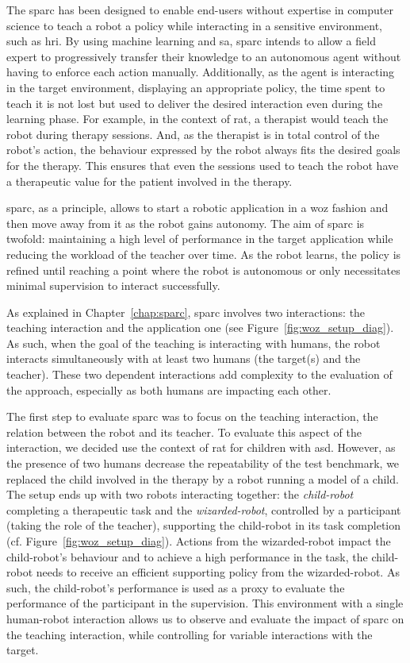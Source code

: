 The \gls{sparc} has been designed to enable end-users without expertise in computer science to teach a robot a policy while interacting in a sensitive environment, such as \gls{hri}. By using machine learning and \gls{sa}, \gls{sparc} intends to allow a field expert to progressively transfer their knowledge to an autonomous agent without having to enforce each action manually. Additionally, as the agent is interacting in the target environment, displaying an appropriate policy, the time spent to teach it is not lost but used to deliver the desired interaction even during the learning phase. For example, in the context of \gls{rat}, a therapist would teach the robot during therapy sessions. And, as the therapist is in total control of the robot's action, the behaviour expressed by the robot always fits the  desired goals for the therapy. This ensures that even the sessions used to teach the robot have a therapeutic value for the patient involved in the therapy.

\gls{sparc}, as a principle, allows to start a robotic application in a \gls{woz} fashion and then move away from it as the robot gains autonomy. The aim of \gls{sparc} is twofold: maintaining a high level of performance in the target application while reducing the workload of the teacher over time. As the robot learns, the policy is refined until reaching a point where the robot is autonomous or only necessitates minimal supervision to interact successfully. 

As explained in Chapter~\ref{chap:sparc}, \gls{sparc} involves two interactions: the teaching interaction and the application one (see Figure~\ref{fig:woz_setup_diag}). As such, when the goal of the teaching is interacting with humans, the robot interacts simultaneously with at least two humans (the target(s) and the teacher). These two dependent interactions add complexity to the evaluation of the approach, especially as both humans are impacting each other. 

The first step to evaluate \gls{sparc} was to focus on the teaching interaction, the relation between the robot and its teacher. To evaluate this aspect of the interaction, we decided use the context of \gls{rat} for children with \gls{asd}. However, as the presence of two humans decrease the repeatability of the test benchmark, we replaced the child involved in the therapy by a robot running a model of a child. The setup ends up with two robots interacting together: the \emph{child-robot} completing a therapeutic task and the \emph{wizarded-robot}, controlled by a participant (taking the role of the teacher), supporting the child-robot in its task completion (cf. Figure~\ref{fig:woz_setup_diag}). Actions from the wizarded-robot impact the child-robot's behaviour and to achieve a high performance in the task, the child-robot needs to receive an efficient supporting policy from the wizarded-robot. As such, the child-robot's performance is used as a proxy to evaluate the performance of the participant in the supervision. This environment with a single human-robot interaction allows us to observe and evaluate the impact of \gls{sparc} on the teaching interaction, while controlling for variable interactions with the target.

